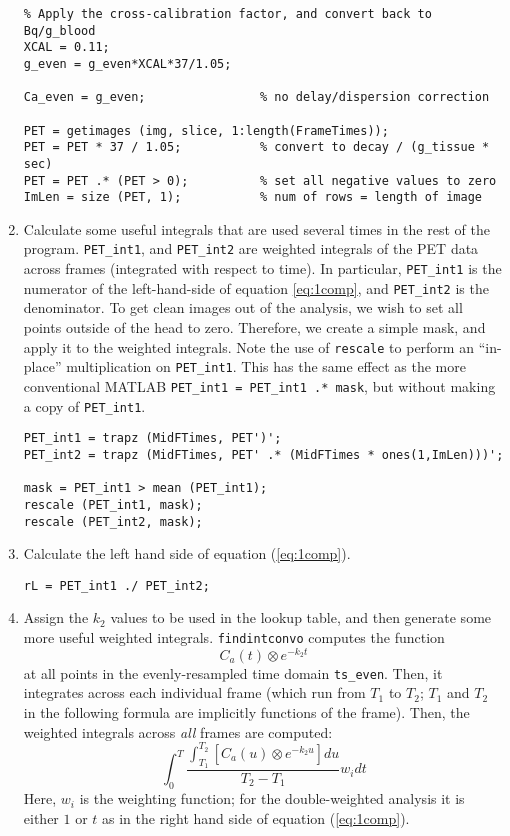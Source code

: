 \documentclass[12pt]{article}
\def\code#1{{\tt #1}}
\begin{document}
\begin{enumerate}
\begin{verbatim}
% Apply the cross-calibration factor, and convert back to Bq/g_blood 
XCAL = 0.11;
g_even = g_even*XCAL*37/1.05;

Ca_even = g_even;                % no delay/dispersion correction

PET = getimages (img, slice, 1:length(FrameTimes));
PET = PET * 37 / 1.05;           % convert to decay / (g_tissue * sec)
PET = PET .* (PET > 0);          % set all negative values to zero
ImLen = size (PET, 1);           % num of rows = length of image
\end{verbatim}

\item Calculate some useful integrals that are used several times in
  the rest of the program.  \code{PET\_int1}, and \code{PET\_int2} are
  weighted integrals of the PET data across frames (integrated with
  respect to time).  In particular, \code{PET\_int1} is the numerator
  of the left-hand-side of equation \ref{eq:1comp}, and
  \code{PET\_int2} is the denominator.  To get clean images out of the
  analysis, we wish to set all points outside of the head to zero.
  Therefore, we create a simple mask, and apply it to the weighted
  integrals.  Note the use of \code{rescale} to perform an
  ``in-place'' multiplication on \code{PET\_int1}.  This has the same
  effect as the more conventional MATLAB 
  \verb|PET_int1 = PET_int1 .* mask|, 
  but without making a copy of \code{PET\_int1}.
\begin{verbatim}
PET_int1 = trapz (MidFTimes, PET')';
PET_int2 = trapz (MidFTimes, PET' .* (MidFTimes * ones(1,ImLen)))';

mask = PET_int1 > mean (PET_int1);
rescale (PET_int1, mask);
rescale (PET_int2, mask);
\end{verbatim}

\item Calculate the left hand side of equation (\ref{eq:1comp}).
\begin{verbatim}
rL = PET_int1 ./ PET_int2;
\end{verbatim}

\item Assign the $k_2$ values to be used in the lookup table, and then
generate some more useful weighted integrals.  \code{findintconvo}
computes the function
\begin{equation}
C_{a}(t) \otimes e^{-k_{2}t}
\end{equation}
at all points in the evenly-resampled time domain \code{ts\_even}.
Then, it integrates across each individual frame (which run from $T_1$
to $T_2$; $T_1$ and $T_2$ in the following formula are implicitly
functions of the frame).  Then, the weighted integrals across {\em all} frames
are computed:
\begin{equation}
\int_{0}^{T} \frac
  {\int_{T_1}^{T_2} \left[ C_{a}(u) \otimes e^{-k_{2}u} \right] du}
  {T_2 - T_1} 
  w_i dt
\label{eq:convint}
\end{equation}
Here, $w_i$ is the weighting function; for the double-weighted
analysis it is either $1$ or $t$ as in the right hand side of equation
(\ref{eq:1comp}).  


\end{enumerate}
\end{document}
